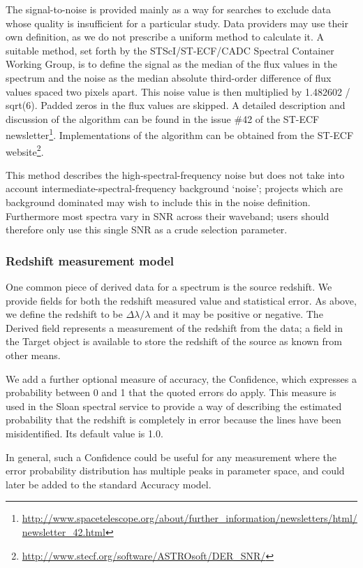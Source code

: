 \documentclass[11pt]{article}
\begin{document}
The signal-to-noise is provided mainly as a way for searches to
exclude data whose quality is insufficient for a particular
study. Data providers may use their own definition, as we do not
prescribe a uniform method to calculate it. A suitable method,
set forth by the STScI/ST-ECF/CADC Spectral Container Working Group, is
to define the signal as the median of the flux values in the spectrum
and the noise as the median absolute third-order difference of flux
values spaced two pixels apart. This noise value is then multiplied by
1.482602 / sqrt(6). Padded zeros in the flux values are skipped. A
detailed description and discussion of the algorithm can be found in the
issue \#42 of the ST-ECF newsletter\footnote{
\url{http://www.spacetelescope.org/about/further_information/newsletters/html/newsletter_42.html}}.
Implementations of the algorithm can be obtained from the ST-ECF website\footnote{\url{http://www.stecf.org/software/ASTROsoft/DER_SNR/}}. 

This method describes the high-spectral-frequency noise
but does not take into account intermediate-spectral-frequency 
background `noise'; projects which are background dominated
may wish to include this in the noise definition. Furthermore
most spectra vary in SNR across their waveband; users
should therefore only use this single SNR as a crude selection
parameter.


\subsubsection{Redshift measurement model}  

One common piece of derived data for a spectrum is the source redshift.
We provide fields for both the redshift measured value and statistical error.
As above, we define the redshift to be $\Delta\lambda/\lambda$ and it
may be positive or negative. The Derived field represents a measurement
of the redshift from the data; a field in the Target object is available
to store the redshift of the source as known from other means. 

We add a further optional measure of accuracy, the Confidence, which expresses
a probability between 0 and 1 that the quoted errors do apply. This measure
is used in the Sloan spectral service to provide a way of describing the
estimated probability that the redshift is completely in error because
the lines have been misidentified. Its default value is 1.0.

In general, such a Confidence could be useful for any measurement where
the error probability distribution has multiple peaks in parameter
space, and could later be added to the standard Accuracy model.
\end{document}
